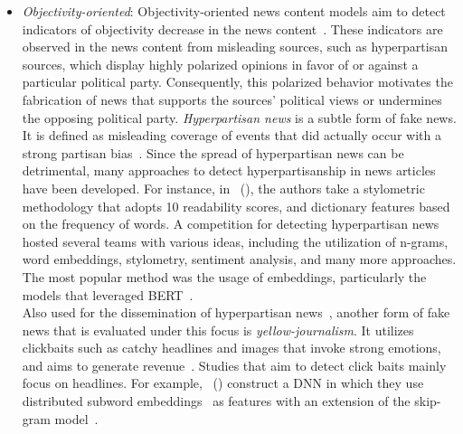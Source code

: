 \begin{description}
\begin{itemize}
        \item \emph{Objectivity-oriented}: Objectivity-oriented news content models aim to detect indicators of objectivity decrease in the news content~\parencite{FakeNewsDetectionOnSocialMediaADataMiningPerspective_Shu}. These indicators are observed in the news content from misleading sources, such as hyperpartisan sources, which display highly polarized opinions in favor of or against a particular political party. Consequently, this polarized behavior motivates the fabrication of news that supports the sources’ political views or undermines the opposing political party. \emph{Hyperpartisan news} is a subtle form of fake news. It is defined as misleading coverage of events that did actually occur with a strong partisan bias~\parencite{FightingMisinformationOnSocialMedia_Pennycook}. Since the spread of hyperpartisan news can be detrimental, many approaches to detect hyperpartisanship in news articles have been developed. For instance, in~\citeauthor{AStylometricInquiry_Potthast} (\citeyear{AStylometricInquiry_Potthast}), the authors take a stylometric methodology that adopts 10 readability scores, and dictionary features based on the frequency of words. A competition for detecting hyperpartisan news~\parencite{SemEvalHyperpartisanNewsDetection_Kiesel} hosted several teams with various ideas, including the utilization of n-grams, word embeddings, stylometry, sentiment analysis, and many more approaches. The most popular method was the usage of embeddings, particularly the models that leveraged BERT~\parencite{BERT_Devlin}.\\ Also used for the dissemination of hyperpartisan news~\parencite{SemEvalHyperpartisanNewsDetection_Kiesel}, another form of fake news that is evaluated under this focus is \emph{yellow-journalism}. It utilizes clickbaits such as catchy headlines and images that invoke strong emotions, and aims to generate revenue~\parencite{ClickbaitDetectionUsingDL_Agrawal, ClickbaitAndTabloidStrategies_Dolors}. Studies that aim to detect click baits mainly focus on headlines. For example,~\citeauthor{DivingDeepIntoClickbaits_Rony} (\citeyear{DivingDeepIntoClickbaits_Rony})  construct a DNN in which they use distributed subword embeddings~\parencite{EnrichingWordVectorsWithSubwordInfo_Bojanowski, BagOfTricksForTextClassificatoin_Joulin} as features with an extension of the skip-gram model~\parencite{DistributedRepresentationsOfWords_Mikolov}.
    \end{itemize}

\end{description}
